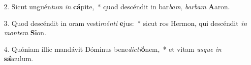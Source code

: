 2. Sicut unguén\textit{tum} \textit{in} \textbf{cá}pite,~*  quod descéndit in bar\textit{bam}, \textit{bar}\textit{bam} \textbf{A}aron.\

3. Quod descéndit in oram vesti\textit{mén}\textit{ti} \textbf{e}jus:~*  sicut ros Hermon, qui descéndit \textit{in} \textit{mon}\textit{tem} \textbf{Si}on.\

4. Quóniam illic mandávit Dóminus bene\textit{dic}\textit{ti}\textbf{ó}nem,~*  et vitam \textit{us}\textit{que} \textit{in} \textbf{sǽ}culum.\

